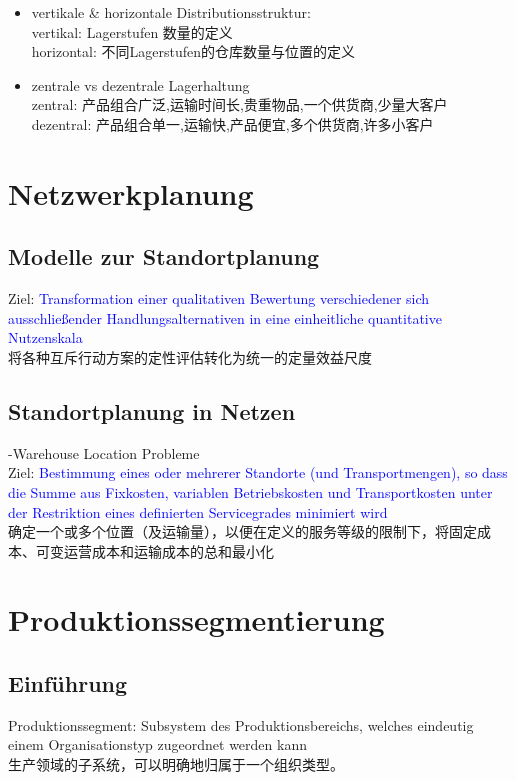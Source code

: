 \documentclass[12pt, letterpaper]{article}
\begin{document}
\begin{CJK*}{UTF8}{gbsn}
\begin{itemize}
\item vertikale \& horizontale Distributionsstruktur:\\[1mm]
vertikal: Lagerstufen 数量的定义\\[1mm]
horizontal: 不同Lagerstufen的仓库数量与位置的定义
\item zentrale vs dezentrale Lagerhaltung\\[1mm]
zentral: 产品组合广泛,运输时间长,贵重物品,一个供货商,少量大客户\\[1mm]
dezentral: 产品组合单一,运输快,产品便宜,多个供货商,许多小客户\\
\end{itemize}

\newpage
\section{Netzwerkplanung}
\subsection{Modelle zur Standortplanung}
Ziel: \textcolor{blue}{Transformation einer qualitativen Bewertung verschiedener sich ausschließender Handlungsalternativen in eine einheitliche quantitative Nutzenskala}\\[1mm]
将各种互斥行动方案的定性评估转化为统一的定量效益尺度

\subsection{Standortplanung in Netzen}
-Warehouse Location Probleme\\[1mm]
Ziel: \textcolor{blue}{Bestimmung eines oder mehrerer Standorte (und Transportmengen), so dass die Summe aus Fixkosten, variablen Betriebskosten und Transportkosten unter der Restriktion eines definierten Servicegrades minimiert wird}\\[1mm]
确定一个或多个位置（及运输量），以便在定义的服务等级的限制下，将固定成本、可变运营成本和运输成本的总和最小化

\newpage
\section{Produktionssegmentierung}
\subsection{Einführung}
Produktionssegment: Subsystem des Produktionsbereichs, welches eindeutig einem Organisationstyp zugeordnet
werden kann\\[1mm]
生产领域的子系统，可以明确地归属于一个组织类型。


\end{CJK*}
\end{document}
